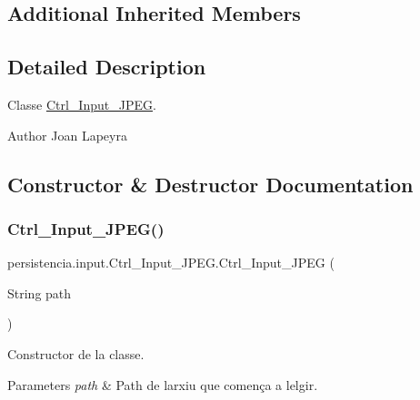 \subsection*{Additional Inherited Members}


\subsection{Detailed Description}
Classe \hyperlink{classpersistencia_1_1input_1_1Ctrl__Input__JPEG}{Ctrl\+\_\+\+Input\+\_\+\+J\+P\+EG}. 

\begin{DoxyAuthor}{Author}
Joan Lapeyra 
\end{DoxyAuthor}


\subsection{Constructor \& Destructor Documentation}
\mbox{\label{classpersistencia_1_1input_1_1Ctrl__Input__JPEG_aa7d81dfa6240a7ee82e5188fc2600c58}} 
\subsubsection{\texorpdfstring{Ctrl\+\_\+\+Input\+\_\+\+J\+P\+E\+G()}{Ctrl\_Input\_JPEG()}\hspace{0.1cm}{\footnotesize\ttfamily [1/2]}}
{\footnotesize\ttfamily persistencia.\+input.\+Ctrl\+\_\+\+Input\+\_\+\+J\+P\+E\+G.\+Ctrl\+\_\+\+Input\+\_\+\+J\+P\+EG (\begin{DoxyParamCaption}\item[{String}]{path }\end{DoxyParamCaption})\hspace{0.3cm}{\ttfamily [inline]}}



Constructor de la classe. 


\begin{DoxyParams}{Parameters}
{\em path} & Path de l\textquotesingle{}arxiu que comença a lelgir. \\
\hline
\end{DoxyParams}

